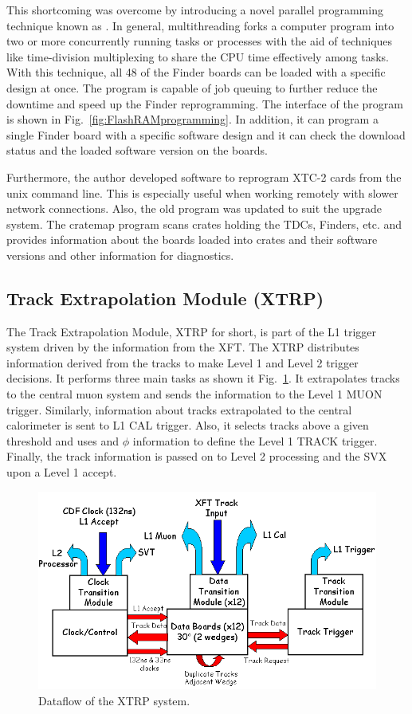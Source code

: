 This shortcoming was overcome by introducing a novel parallel programming technique known as . In general, multithreading forks a computer program into two or more concurrently running tasks or processes with the aid of techniques like time-division multiplexing to share the CPU time effectively among tasks. With this technique, all 48 of the Finder boards can be loaded with a specific design at once. The program is capable of job queuing to further reduce the downtime and speed up the Finder reprogramming. The interface of the program is shown in Fig.~\ref{fig:FlashRAMprogramming}. In addition, it can program a single Finder board with a specific software design and it can check the download status and the loaded software version on the boards.

Furthermore, the author developed software to reprogram XTC-2 cards from the unix command line. This is especially useful when working remotely with slower network connections. Also, the old  program was updated to suit the upgrade system. The cratemap program scans crates holding the TDCs, Finders, etc. and provides information about the boards loaded into crates and their software versions and other information for diagnostics.

\subsection{Track Extrapolation Module (XTRP)}
The Track Extrapolation Module, XTRP for short, is part of the L1 trigger system driven by the information from the XFT. The XTRP distributes information derived from the tracks to make Level 1 and Level 2 trigger decisions. It performs three main tasks as shown it Fig.~\ref{fig:XTRPdataflow}. It extrapolates tracks to the central muon system and sends the information to the Level 1 MUON trigger. Similarly, information about tracks extrapolated to the central calorimeter is sent to L1 CAL trigger. Also, it selects tracks above a given \pt threshold and uses \pt and $\phi$ information to define the Level 1 TRACK trigger. Finally, the track information is passed on to Level 2 processing and the SVX upon a Level 1 accept.

\begin{figure}[htb!]
 \centering
 \includegraphics[scale=0.6]{./XTRP_dataflow.png}
 \caption{Dataflow of the XTRP system.}
 \label{fig:XTRPdataflow}
\end{figure}



